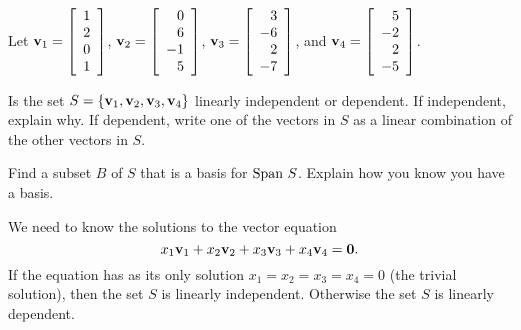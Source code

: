 \label{sec:indep_exam}

\ExampleIntro

\begin{example} Let $\mathbf{v}_1 = \left[ \begin{array}{c} 1\\2\\0\\1 \end{array} \right]$, $\mathbf{v}_2 = \left[ \begin{array}{r} 0\\6\\-1\\5 \end{array} \right]$, $\mathbf{v}_3 = \left[ \begin{array}{r} 3\\-6\\2\\-7\end{array} \right]$, and $\mathbf{v}_4 = \left[ \begin{array}{r} 5\\-2\\2\\-5 \end{array} \right]$.
	\ba
	\item Is the set $S = \{\mathbf{v}_1, \mathbf{v}_2, \mathbf{v}_3, \mathbf{v}_4\}$ linearly independent or dependent. If independent, explain why. If dependent, write one of the vectors in $S$ as a linear combination of the other vectors in $S$.
	
	\item Find a subset $B$ of $S$ that is a basis for $\text{Span} \ S$. Explain how you know you have a basis.
	
	\ea
	
\ExampleSolution
\ba
\item We need to know the solutions to the vector equation
\[x_1 \mathbf{v}_1 + x_2 \mathbf{v}_2 + x_3 \mathbf{v}_3 + x_4 \mathbf{v}_4 = \mathbf{0}.\]
If the equation has as its only solution $x_1 = x_2 = x_3 = x_4 = 0$ (the trivial solution), then the set $S$ is linearly independent. Otherwise the set $S$ is linearly dependent.


\end{example}
